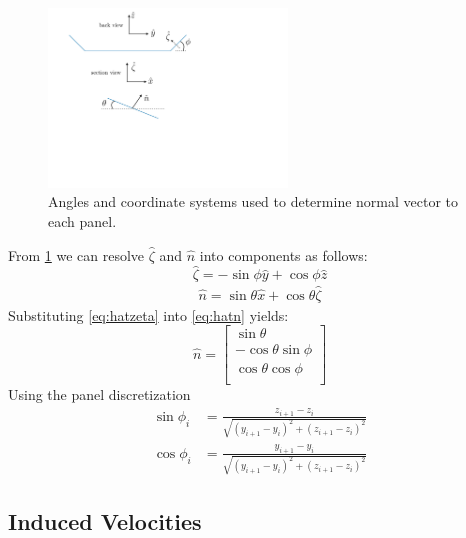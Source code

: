 \documentclass{article}
\begin{document}
\begin{figure}[htbp]
\centering
\includegraphics[width=2.5in]{figs/normalvector}
\caption{Angles and coordinate systems used to determine normal vector to each panel.}
\label{fig:normalvector}
\end{figure}

From \cref{fig:normalvector} we can resolve $\hat\zeta$ and $\hat{n}$ into components as follows:
\begin{equation}
\hat\zeta = -\sin\phi \hat{y} + \cos\phi \hat{z}
\label{eq:hatzeta}
\end{equation}
\begin{align}
\hat{n} = \sin\theta \hat{x} + \cos\theta \hat{\zeta}
\label{eq:hatn}
\end{align}
Substituting \cref{eq:hatzeta} into \cref{eq:hatn} yields:
\begin{equation}
    \hat{n} =
    \begin{bmatrix}
        \sin\theta\\
        -\cos\theta\sin\phi\\
        \cos\theta\cos\phi\\
    \end{bmatrix}
\end{equation}
Using the panel discretization
\begin{align}
    \sin\phi_i &= \frac{z_{i+1} - z_i}{\sqrt{(y_{i+1} - y_i)^2 + (z_{i+1} - z_i)^2}}\\
    \cos\phi_i &= \frac{y_{i+1} - y_i}{\sqrt{(y_{i+1} - y_i)^2 + (z_{i+1} - z_i)^2}}
\end{align}

\subsection{Induced Velocities}
\end{document}
